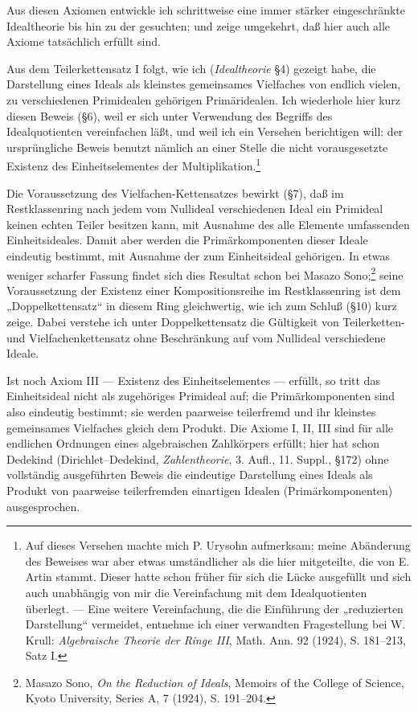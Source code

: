 \documentclass[11pt]{article}
\begin{document}
Aus diesen Axiomen entwickle ich schrittweise eine immer stärker eingeschränkte
Idealtheorie bis hin zu der gesuchten; und zeige umgekehrt, daß hier auch alle
Axiome tatsächlich erfüllt sind.

Aus dem Teilerkettensatz I folgt, wie ich (\emph{Idealtheorie} §4) gezeigt habe,
die Darstellung eines Ideals als kleinstes gemeinsames Vielfaches von endlich
vielen, zu verschiedenen Primidealen gehörigen Primäridealen. Ich wiederhole
hier kurz diesen Beweis (§6), weil er sich unter Verwendung des Begriffs des
Idealquotienten vereinfachen läßt, und weil ich ein Versehen berichtigen will:
der ursprüngliche Beweis benutzt nämlich an einer Stelle die nicht vorausgesetzte
Existenz des Einheitselementes der Multiplikation.\footnote{Auf dieses Versehen
machte mich P. Urysohn aufmerksam; meine Abänderung des Beweises war aber
etwas umständlicher als die hier mitgeteilte, die von E. Artin stammt. Dieser
hatte schon früher für sich die Lücke ausgefüllt und sich auch unabhängig von mir
die Vereinfachung mit dem Idealquotienten überlegt. — Eine weitere Vereinfachung,
die die Einführung der „reduzierten Darstellung“ vermeidet, entnehme ich einer
verwandten Fragestellung bei W. Krull: \emph{Algebraische Theorie der Ringe III},
Math. Ann. 92 (1924), S. 181--213, Satz I.}

Die Voraussetzung des Vielfachen-Kettensatzes bewirkt (§7), daß im
Restklassenring nach jedem vom Nullideal verschiedenen Ideal ein Primideal keinen
echten Teiler besitzen kann, mit Ausnahme des alle Elemente umfassenden
Einheitsideales. Damit aber werden die Primärkomponenten dieser Ideale eindeutig
bestimmt, mit Ausnahme der zum Einheitsideal gehörigen. In etwas weniger
scharfer Fassung findet sich dies Resultat schon bei Masazo Sono;\footnote{Masazo
Sono, \emph{On the Reduction of Ideals}, Memoirs of the College of Science,
Kyoto University, Series A, 7 (1924), S. 191--204.} seine Voraussetzung der
Existenz einer Kompositionsreihe im Restklassenring ist dem „Doppelkettensatz“
in diesem Ring gleichwertig, wie ich zum Schluß (§10) kurz zeige. Dabei verstehe
ich unter Doppelkettensatz die Gültigkeit von Teilerketten- und Vielfachenkettensatz
ohne Beschränkung auf vom Nullideal verschiedene Ideale.

Ist noch Axiom III — Existenz des Einheitselementes — erfüllt, so tritt das
Einheitsideal nicht als zugehöriges Primideal auf; die Primärkomponenten sind also
eindeutig bestimmt; sie werden paarweise teilerfremd und ihr kleinstes gemeinsames
Vielfaches gleich dem Produkt. Die Axiome I, II, III sind für alle endlichen
Ordnungen eines algebraischen Zahlkörpers erfüllt; hier hat schon Dedekind
(Dirichlet--Dedekind, \emph{Zahlentheorie}, 3. Aufl., 11. Suppl., §172) ohne
vollständig ausgeführten Beweis die eindeutige Darstellung eines Ideals als Produkt
von paarweise teilerfremden einartigen Idealen (Primärkomponenten) ausgesprochen.
\end{document}
